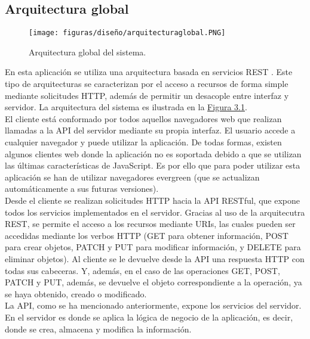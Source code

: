 \subsection{Arquitectura global}

\begin{figure}[H]
\centerline{\texttt{[image: figuras/diseño/arquitecturaglobal.PNG]}}
\caption{Arquitectura global del sistema.}
\label{enlaceArquitecturaGlobal}
\end{figure}

En esta aplicación se utiliza una arquitectura basada en servicios REST \cite{rest}. Este tipo de arquitecturas se caracterizan por el acceso a recursos de forma simple mediante solicitudes HTTP, además de permitir un desacople entre interfaz y servidor. La arquitectura del sistema es ilustrada en la \hyperref[enlaceArquitecturaGlobal]{Figura 3.1}.
\\

El cliente está conformado por todos aquellos navegadores web que realizan llamadas a la API del servidor mediante su propia interfaz. El usuario accede a cualquier navegador y puede utilizar la aplicación. De todas formas, existen algunos clientes web donde la aplicación no es soportada debido a que se utilizan las últimas características de JavaScript. Es por ello que para poder utilizar esta aplicación se han de utilizar navegadores evergreen \cite{evergreen} (que se actualizan automáticamente a sus futuras versiones).
\\

Desde el cliente se realizan solicitudes HTTP hacia la API RESTful, que expone todos los servicios implementados en el servidor. Gracias al uso de la arquitecutra REST, se permite el acceso a los recursos mediante URIs, las cuales pueden ser accedidas mediante los verbos HTTP (GET para obtener información, POST para crear objetos, PATCH y PUT para modificar información, y DELETE para eliminar objetos). Al cliente se le devuelve desde la API una respuesta HTTP con todas sus cabeceras. Y, además, en el caso de las operaciones GET, POST, PATCH y PUT, además, se devuelve el objeto correspondiente a la operación, ya se haya obtenido, creado o modificado.
\\

La API, como se ha mencionado anteriormente, expone los servicios del servidor. En el servidor es donde se aplica la lógica de negocio \cite{logicanegocio} de la aplicación, es decir, donde se crea, almacena y modifica la información.
\\


